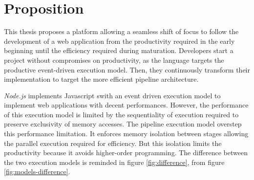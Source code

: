 \section{Proposition} \label{chapter4:proposition}

This thesis proposes a platform allowing a seamless shift of focus to follow the development of a web application from the productivity required in the early beginning until the efficiency required during maturation.
Developers start a project without compromises on productivity, as the language targets the productive event-driven execution model.
Then, they continuously transform their implementation to target the more efficient pipeline architecture.



\textit{Node.js} implements Javascript swith an event driven execution model to implement web applications with decent performances.
However, the performance of this execution model is limited by the sequentiality of execution required to preserve exclusivity of memory accesses.
The pipeline execution model overstep this performance limitation.
It enforces memory isolation between stages allowing the parallel execution required for efficiency.
But this isolation limits the productivity because it avoids higher-order programming.
The difference between the two execution models is reminded in figure \ref{fig:difference}, from figure \ref{fig:models-difference}.

